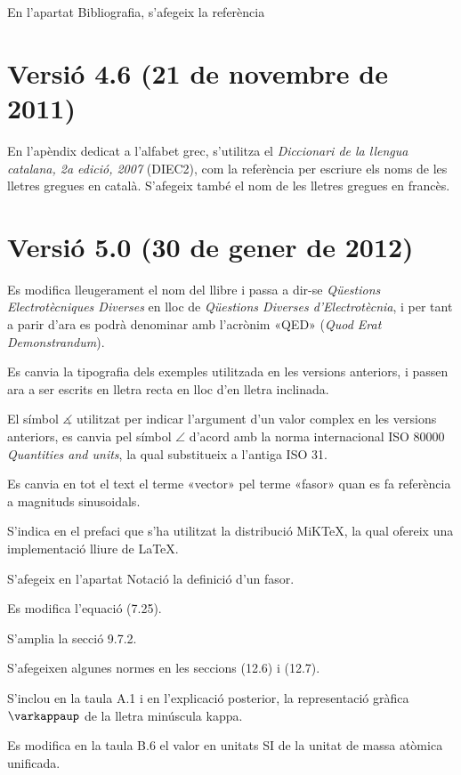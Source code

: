 En l'apartat Bibliografia, s'afegeix la referència \cite{RJB}


\section*{Versió 4.6 (21 de novembre de 2011)}

En l'apèndix dedicat a l'alfabet grec, s'utilitza el \textit{Diccionari de la llengua catalana, 2a edició, 2007} (DIEC2), com la referència per escriure els noms de les lletres gregues en català. S'afegeix també el nom de les lletres gregues en francès.


\section*{Versió 5.0 (30 de gener de 2012)}

Es modifica lleugerament el nom del llibre i  passa a dir-se \textit{Qüestions Electrotècniques Diverses} en lloc de \textit{Qüestions Diverses d'Electrotècnia}, i per tant a parir d'ara es podrà denominar amb l'acrònim «QED» (\emph{Quod Erat Demonstrandum}).

Es canvia la tipografia dels exemples utilitzada en les versions anteriors, i passen ara a ser escrits en lletra recta en lloc d'en lletra inclinada.

El símbol $\measuredangle$ utilitzat per indicar l'argument d'un valor complex en les versions anteriors, es canvia pel símbol $\angle$ d'acord amb la norma internacional ISO 80000 \textit{Quantities and units}, la qual substitueix a l'antiga ISO 31.

Es canvia en tot el text el terme «vector» pel terme «fasor» quan es fa referència a magnituds sinusoidals.

S'indica en el prefaci que s'ha utilitzat la distribució MiK\TeX, la qual ofereix una implementació lliure de \LaTeX.

S'afegeix en l'apartat Notació la definició d'un fasor.

Es modifica l'equació (7.25).

S'amplia la secció 9.7.2.

S'afegeixen algunes normes en les seccions (12.6) i (12.7).

S'inclou en la taula A.1 i en l'explicació posterior, la representació gràfica $\varkappaup$ de la lletra minúscula kappa.

Es modifica en la taula B.6 el valor en unitats SI de la unitat de massa atòmica unificada.

